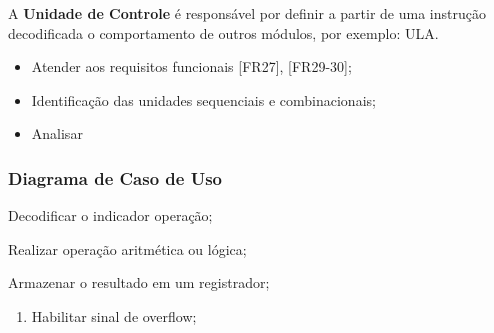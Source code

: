  
    A \textbf{Unidade de Controle} é responsável por definir a partir de uma instrução decodificada o comportamento de outros módulos, 
    por exemplo: ULA. 
  
  \actors
    \begin{description}
    \end{description}
  
  \preconditions 
    \begin{itemize}
     \item Atender aos requisitos funcionais [FR27], [FR29-30];
     \item Identificação das unidades sequenciais e combinacionais;
    \end{itemize}

  \postconditions
    \begin{itemize}
      \item Analisar
    \end{itemize}
  
  \subsubsection*{Diagrama de Caso de Uso}
    \begin{landscape}
  	
 	\end{landscape}
 
  
  \begin{mainflow}
    \item Decodificar o indicador operação;
    \item Realizar operação aritmética ou lógica;
    \item Armazenar o resultado em um registrador;
  \end{mainflow}
  
  \begin{secondaryflow} 
    \begin{enumerate}
      \item Habilitar sinal de overflow;
    \end{enumerate}
  \end{secondaryflow} 